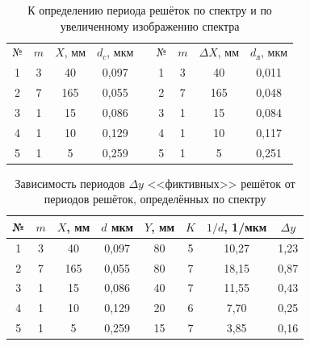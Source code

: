 \documentclass[a4paper]{article}
\begin{document}
    \begin{table}[h!]
        \centering
        \caption{К определению периода решёток по спектру и по увеличенному изображению спектра}
        \begin{tabular}{|c|c|c|c|c|c|c|c|c|}
        \cline{1-4} \cline{6-9}
        № & $m$ & $X$, мм & $d_c$, мкм &  & № & $m$ & $\Delta X$, мм & $d_{\text{л}}$, мкм \\ \cline{1-4} \cline{6-9} 
        1 & 3   & 40  & 0,097    &  & 1 & 3   & 40         & 0,011    \\ \cline{1-4} \cline{6-9} 
        2 & 7   & 165 & 0,055    &  & 2 & 7   & 165        & 0,048    \\ \cline{1-4} \cline{6-9} 
        3 & 1   & 15  & 0,086    &  & 3 & 1   & 15         & 0,084    \\ \cline{1-4} \cline{6-9} 
        4 & 1   & 10  & 0,129    &  & 4 & 1   & 10         & 0,117    \\ \cline{1-4} \cline{6-9} 
        5 & 1   & 5   & 0,259    &  & 5 & 1   & 5          & 0,251    \\ \cline{1-4} \cline{6-9} 
        \end{tabular}
        \end{table}

        \begin{table}[h!]
            \centering
            \caption{Зависимость периодов $\Delta y$ <<фиктивных>> решёток от периодов решёток, определённых по спектру}
            \begin{tabular}{|c|c|c|c|c|c|c|c|}
            \hline
            № & $m$ & $X$, мм & $d$ мкм & $Y$, мм & $K$ & $1/d$, 1/мкм & $\Delta y$ \\ \hline
            1 & 3   & 40      & 0,097   & 80      & 5   & 10,27        & 1,23       \\ \hline
            2 & 7   & 165     & 0,055   & 80      & 7   & 18,15        & 0,87       \\ \hline
            3 & 1   & 15      & 0,086   & 40      & 7   & 11,55        & 0,43       \\ \hline
            4 & 1   & 10      & 0,129   & 20      & 6   & 7,70         & 0,25       \\ \hline
            5 & 1   & 5       & 0,259   & 15      & 7   & 3,85         & 0,16       \\ \hline
            \end{tabular}
            \end{table}
\end{document}
